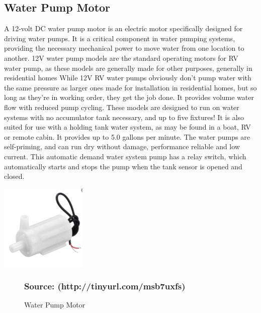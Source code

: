 \documentclass[12pt,a4paper]{report}
\begin{document}
	\subsection{Water Pump Motor}
	\begin{justify}
		A 12-volt DC water pump motor is an electric motor specifically designed for driving water pumps. It is a critical component in water pumping systems, providing the necessary mechanical power to move water from one location to another. 12V water pump models are the standard operating motors for RV water pump, as these models are generally made for other purposes, generally in residential homes While 12V RV water pumps obviously don't pump water with the same pressure as larger ones made for installation in residential homes, but so long as they're in working order, they get the job done. It provides volume water flow with reduced pump cycling. These models are designed to run on water systems with no accumulator tank necessary, and up to five fixtures! It is also suited for use with a holding tank water system, as may be found in a boat, RV or remote cabin. It provides up to 5.0 gallons per minute. The water pumps are self-priming, and can run dry without damage, performance reliable and low current. This automatic demand water system pump has a relay switch, which automatically starts and stops the pump when the tank sensor is opened and closed.
	\end{justify}
	
	\begin{center}
		\includegraphics[width=0.31\textwidth]{images//water_pump.png} 
		
		\begin{figure}[ht]
			
			
			\caption{Water Pump Motor}
			
			\subsubsection{Source: (http://tinyurl.com/msb7uxfs)}
		\end{figure}
		
		
		
		
	\end{center}
	
\end{document}
